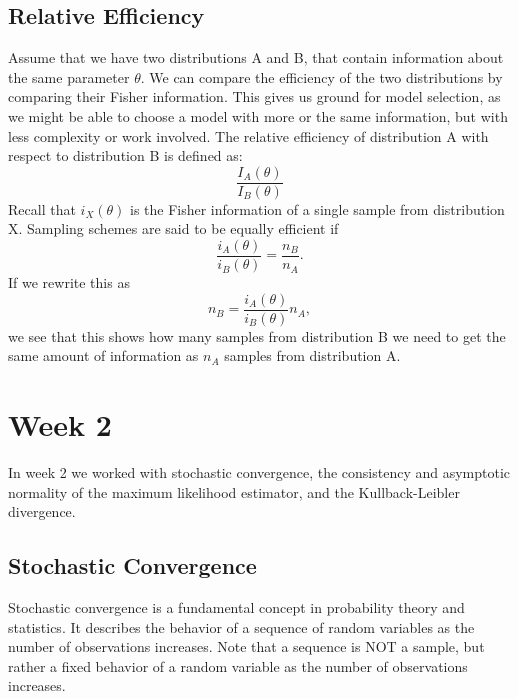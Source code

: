 \documentclass{article}
\theoremstyle{definition}
\theoremstyle{remark}
\begin{document}
\subsection{Relative Efficiency}
Assume that we have two distributions A and B, that contain information about the same parameter $\theta$. We can compare the efficiency of the two distributions by comparing their Fisher information. This gives us ground for model selection, as we might be able to choose a model with more or the same information, but with less complexity or work involved. The relative efficiency of distribution A with respect to distribution B is defined as:
\begin{equation}
    \dfrac{I_A(\theta)}{I_B(\theta)}
\end{equation}
Recall that $i_X(\theta)$ is the Fisher information of a single sample from distribution X. Sampling schemes are said to be equally efficient if
\begin{equation}
    \dfrac{i_A(\theta)}{i_B(\theta)} = \dfrac{n_B}{n_A}.
\end{equation}
If we rewrite this as
\begin{equation}
    n_B = \dfrac{i_A(\theta)}{i_B(\theta)} n_A,
\end{equation}
we see that this shows how many samples from distribution B we need to get the same amount of information as $n_A$ samples from distribution A.

\section{Week 2}

In week 2 we worked with stochastic convergence, the consistency and asymptotic normality of the maximum likelihood estimator, and the Kullback-Leibler divergence.

\subsection{Stochastic Convergence}
Stochastic convergence is a fundamental concept in probability theory and statistics. It describes the behavior of a sequence of random variables as the number of observations increases. Note that a sequence is NOT a sample, but rather a fixed behavior of a random variable as the number of observations increases. 
\end{document}
